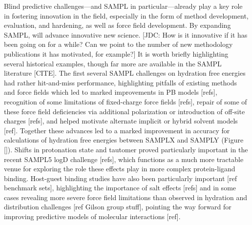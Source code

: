 \documentclass[11pt]{article}
\begin{document}
Blind predictive challenges---and SAMPL in particular---already play a key role in fostering innovation in the field, especially in the form of method development, evaluation, and hardening, as well as force field development. 
By expanding SAMPL, will advance innovative new science. 
{\color{red}[JDC: How is it innovative if it has been going on for a while? Can we point to the number of new methodology publications it has motivated, for example?]}
It is worth briefly highlighting several historical examples, though far more are available in the SAMPL literature [CITE]. 
The first several SAMPL challenges on hydration free energies had rather hit-and-miss performance, highlighting pitfalls of existing methods and force fields which led to marked improvements in PB models [refs],
 recognition of some limitations of fixed-charge force fields [refs],
repair of some of these force field deficiencies via additional polarization or introduction of off-site charges [refs],
and helped motivate alternate implicit or hybrid solvent models [ref].
Together these advances led to a marked improvement in accuracy for calculations of hydration free energies between SAMPLX and SAMPLY (Figure []).
%
%
Shifts in protonation state and tautomer proved particularly important in the recent SAMPL5 logD challenge [refs], which functions as a much more tractable venue for exploring the role these effects play in more complex protein-ligand binding.
Host-guest binding studies have also been particularly important [ref benchmark sets],
highlighting the importance of salt effects [refs]
and in some cases revealing more severe force field limitations than observed in hydration and distribution challenges [ref Gilson group stuff],
pointing the way forward for improving predictive models of molecular interactions [ref].
\end{document}
